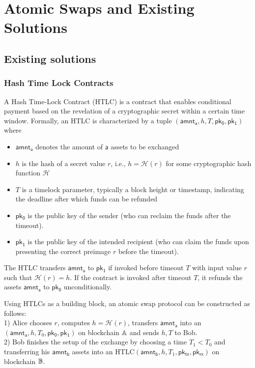 
\section{Atomic Swaps and Existing Solutions}\label{sec:atomic_swap_overview}


\subsection{Existing solutions}

\subsubsection{Hash Time Lock Contracts}

A Hash Time-Lock Contract (HTLC) is a contract that enables conditional payment based on the revelation of a cryptographic secret within a certain time window. Formally, an HTLC is characterized by a tuple  $(\mathsf{amnt_a}, h, T, \mathsf{pk_0}, \mathsf{pk_1})$ where
\begin{itemize}
	\item $\mathsf{amnt_a}$ denotes the amount of $\mathsf{a}$ assets to be exchanged
	\item $h$ is the hash of a secret value $r$, i.e., $h = \mathcal{H}(r)$ for some cryptographic hash function $\mathcal{H}$
	\item $T$ is a timelock parameter, typically a block height or timestamp, indicating the deadline after which funds can be refunded
	\item $\mathsf{pk_0}$ is the public key of the sender (who can reclaim the funds after the timeout).
	\item $\mathsf{pk_1}$ is the public key of the intended recipient (who can claim the funds upon presenting the correct preimage $r$ before the timeout).
\end{itemize}


The HTLC transfers $\mathsf{amnt_a}$ to $\mathsf{pk_1}$ if invoked before timeout $T$ with input value $r$ such that $\mathcal{H}(r) = h$. 
If the contract is invoked after timeout $T$, it refunds the assets $\mathsf{amnt_a}$ to $\mathsf{pk_0}$ unconditionally.

Using HTLCs as a building block, an atomic swap protocol can be constructed as follows: \\
1) Alice chooses $r$, computes $h = \mathcal{H}(r)$, transfers $\mathsf{amnt_a}$ into an $(\mathsf{amnt_a}, h, T_0, \mathsf{pk_0}, \mathsf{pk_1})$ on blockchain $\mathbb{A}$ and sends $h,T$ to Bob. \\
2) Bob finishes the setup of the exchange by choosing a time $T_1 < T_0$ and transferring his $\mathsf{amnt_b}$ assets into an HTLC$(\mathsf{amnt_b}, h, T_1, \mathsf{pk_{tx}}, \mathsf{pk_{rx}})$ on blockchain $\mathbb{B}$.

